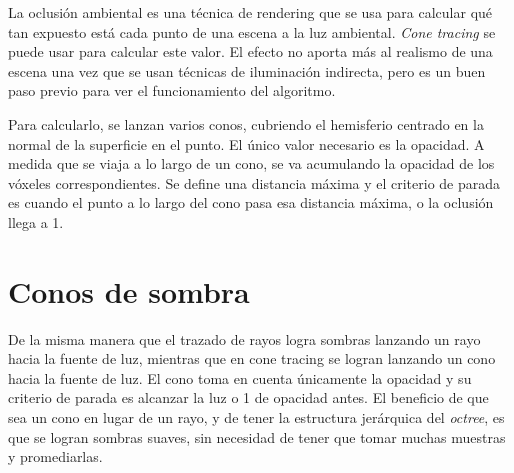 La oclusión ambiental es una técnica de rendering que se usa para calcular qué tan expuesto está cada punto de una escena a la luz ambiental.
\textit{Cone tracing} se puede usar para calcular este valor.
El efecto no aporta más al realismo de una escena una vez que se usan técnicas de iluminación indirecta, pero es un buen paso previo para ver el funcionamiento del algoritmo.

Para calcularlo, se lanzan varios conos, cubriendo el hemisferio centrado en la normal de la superficie en el punto.
El único valor necesario es la opacidad.
A medida que se viaja a lo largo de un cono, se va acumulando la opacidad de los vóxeles correspondientes.
Se define una distancia máxima y el criterio de parada es cuando el punto a lo largo del cono pasa esa distancia máxima, o la oclusión llega a 1.

\section{Conos de sombra}

De la misma manera que el trazado de rayos logra sombras lanzando un rayo hacia la fuente de luz, mientras que en cone tracing se logran lanzando un cono hacia la fuente de luz.
El cono toma en cuenta únicamente la opacidad y su criterio de parada es alcanzar la luz o 1 de opacidad antes.
El beneficio de que sea un cono en lugar de un rayo, y de tener la estructura jerárquica del \textit{octree}, es que se logran sombras suaves, sin necesidad de tener que tomar muchas muestras y promediarlas.

